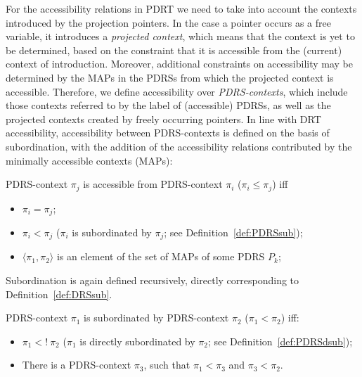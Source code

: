 For the accessibility relations in PDRT we need to take into account the
contexts introduced by the projection pointers. In the case a pointer occurs
as a free variable, it introduces a \textit{projected context}, which means
that the context is yet to be determined, based on the constraint that it is
accessible from the (current) context of introduction.  Moreover, additional
constraints on accessibility may be determined by the MAPs in the PDRSs from
which the projected context is accessible.
Therefore, we define accessibility over \textit{PDRS-contexts}, which
include those contexts referred to by the label of (accessible) PDRSs, as
well as the projected contexts created by freely occurring pointers.  In
line with DRT accessibility, accessibility between PDRS-contexts is defined
on the basis of subordination, with the addition of the accessibility
relations contributed by the minimally accessible contexts (MAPs):

\begin{definition}
PDRS-context $\pi_j$ is accessible from PDRS-context $\pi_i$ 
($\pi_i \leq \pi_j$) iff
  \begin{itemize}
    \item $\pi_i = \pi_j$;
    \item $\pi_i < \pi_j$ ($\pi_i$ is subordinated by $\pi_j$; see
      Definition~\ref{def:PDRSsub});
    \item $\langle \pi_1,\pi_2 \rangle$ is an element of the set of
     MAPs of some PDRS $P_k$;
  \end{itemize}
\end{definition}

\noindent Subordination is again defined recursively, directly corresponding
to Definition~\ref{def:DRSsub}.

\begin{subdefinition}\label{def:PDRSsub}
PDRS-context $\pi_1$ is subordinated by PDRS-context $\pi_2$
($\pi_1 < \pi_2$) iff:
\begin{itemize}
   \item $\pi_1 <!~\pi_2$ ($\pi_1$ is directly subordinated by $\pi_2$; 
     see Definition~\ref{def:PDRSdsub});
   \item There is a PDRS-context $\pi_3$, such that $\pi_1 < \pi_3$ and
     $\pi_3 < \pi_2$.
\end{itemize}
\end{subdefinition}

